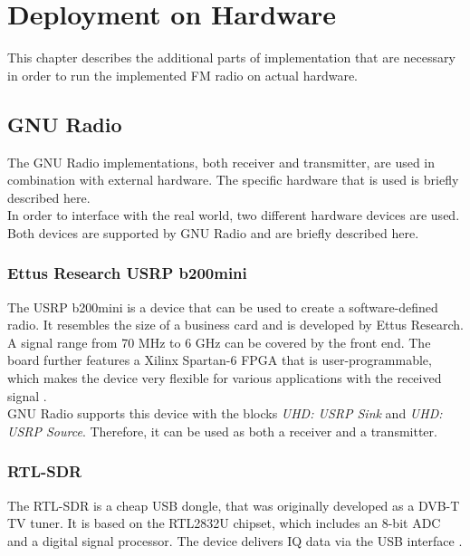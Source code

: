 \chapter{Deployment on Hardware}
\label{cha:DeploymentOnHardware}

This chapter describes the additional parts of implementation that are necessary in order to run the implemented FM radio on actual hardware.

\section{GNU Radio}

The GNU Radio implementations, both receiver and transmitter, are used in combination with external hardware.
The specific hardware that is used is briefly described here.\\

In order to interface with the real world, two different hardware devices are used.
Both devices are supported by GNU Radio and are briefly described here.

\subsection{Ettus Research USRP b200mini}

The USRP b200mini is a device that can be used to create a software-defined radio.
It resembles the size of a business card and is developed by Ettus Research.
A signal range from 70 MHz to 6 GHz can be covered by the front end.
The board further features a Xilinx Spartan-6 FPGA that is user-programmable, which makes the device very flexible for various applications with the received signal \cite{USRPb200Mini}.\\

GNU Radio supports this device with the blocks \textit{UHD: USRP Sink} and \textit{UHD: USRP Source}.
Therefore, it can be used as both a receiver and a transmitter.

\subsection{RTL-SDR}

The RTL-SDR is a cheap USB dongle, that was originally developed as a DVB-T TV tuner.
It is based on the RTL2832U chipset, which includes an 8-bit ADC and a digital signal processor.
The device delivers IQ data via the USB interface \cite{RTLSDR}.\\

